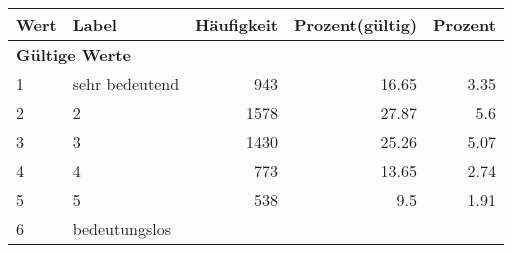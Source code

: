      \begin{longtable}{lXrrr}
     \toprule
     \textbf{Wert} & \textbf{Label} & \textbf{Häufigkeit} & \textbf{Prozent(gültig)} & \textbf{Prozent} \\
     \endhead
     \midrule
     \multicolumn{5}{l}{\textbf{Gültige Werte}}\\

     1 &
     \multicolumn{1}{X}{ sehr bedeutend   } &


       \num{943} &
       \num[round-mode=places,round-precision=2]{16,65} &
         \num[round-mode=places,round-precision=2]{3,35} \\

     2 &
     \multicolumn{1}{X}{ 2   } &


       \num{1578} &
       \num[round-mode=places,round-precision=2]{27,87} &
         \num[round-mode=places,round-precision=2]{5,6} \\

     3 &
     \multicolumn{1}{X}{ 3   } &


       \num{1430} &
       \num[round-mode=places,round-precision=2]{25,26} &
         \num[round-mode=places,round-precision=2]{5,07} \\

     4 &
     \multicolumn{1}{X}{ 4   } &


       \num{773} &
       \num[round-mode=places,round-precision=2]{13,65} &
         \num[round-mode=places,round-precision=2]{2,74} \\

     5 &
     \multicolumn{1}{X}{ 5   } &


       \num{538} &
       \num[round-mode=places,round-precision=2]{9,5} &
         \num[round-mode=places,round-precision=2]{1,91} \\

     6 &
     \multicolumn{1}{X}{ bedeutungslos   } &



\end{longtable}
